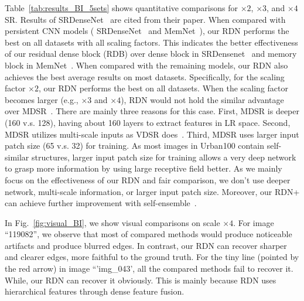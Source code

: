 \documentclass[10pt,twocolumn,letterpaper]{article}
\begin{document}
Table~\ref{tab:results_BI_5sets} shows quantitative comparisons for $\times2$, $\times3$, and $\times4$ SR. Results of SRDenseNet~\cite{tong2017image} are cited from their paper. When compared with persistent CNN models ( SRDenseNet~\cite{tong2017image} and MemNet~\cite{tai2017memnet}), our RDN performs the best on all datasets with all scaling factors. This indicates the better effectiveness of our residual dense block (RDB) over dense block in SRDensenet~\cite{tong2017image} and memory block in MemNet~\cite{tai2017memnet}. When compared with the remaining models, our RDN also achieves the best average results on most datasets. Specifically, for the scaling factor $\times2$, our RDN performs the best on all datasets. When the scaling factor becomes larger (e.g., $\times3$ and $\times4$), RDN would not hold the similar advantage over MDSR~\cite{lim2017enhanced}. There are mainly three reasons for this case. First, MDSR is deeper (160 v.s. 128), having about 160 layers to extract features in LR space. Second, MDSR utilizes multi-scale inputs as VDSR does~\cite{kim2016accurate}. Third, MDSR uses larger input patch size (65 v.s. 32) for training. As most images in Urban100 contain self-similar structures, larger input patch size for training allows a very deep network to grasp more information by using large receptive field better. As we mainly focus on the effectiveness of our RDN and fair comparison, we don't use deeper network, multi-scale information, or larger input patch size. Moreover, our RDN+ can achieve further improvement with self-ensemble~\cite{lim2017enhanced}.

In Fig.~\ref{fig:visual_BI}, we show visual comparisons on scale $\times4$. For image ``119082'', we observe that most of compared methods would produce noticeable artifacts and produce blurred edges. In contrast, our RDN can recover sharper and clearer edges, more faithful to the ground truth. For the tiny line (pointed by the {\color{red}red arrow}) in image ``'img\_043', all the compared methods fail to recover it. While, our RDN can recover it obviously. This is mainly because RDN uses hierarchical features through dense feature fusion.   
\end{document}
